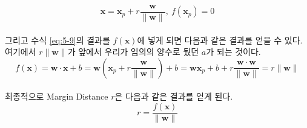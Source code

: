 \documentclass[a4paper]{oblivoir}
\begin{document}
\begin{equation}
\mathbf{x}=\mathbf{x}_p+r\frac{\mathbf{w}}{\lVert \mathbf{w}\rVert},\ f(\mathbf{x}_p)=0
\label{eq:5-9}
\end{equation}\\
\indent 그리고 수식 \eqref{eq:5-9}의 결과를 $f(\mathbf{x})$에 넣게 되면 다음과 같은 결과를 얻을 수 있다. 여기에서 $r\lVert \mathbf{w}\rVert$가 앞에서 우리가 임의의 양수로 뒀던 $a$가 되는 것이다.\\
\begin{equation}
f(\mathbf{x})=\mathbf{w}\cdot \mathbf{x}+b=\mathbf{w}(\mathbf{x}_p+r\frac{\mathbf{w}}{\lVert \mathbf{w}\rVert})+b=\mathbf{wx}_p+b+r\frac{\mathbf{w}\cdot \mathbf{w}}{\lVert \mathbf{w}\rVert}=r\lVert \mathbf{w}\rVert
\label{eq:5-10}
\end{equation}\\
\indent 최종적으로 Margin Distance $r$은 다음과 같은 결과를 얻게 된다.\\
\begin{equation}
r=\frac{f(\mathbf{x})}{\lVert \mathbf{w}\rVert}
\label{eq:5-11}
\end{equation}

\end{document}
